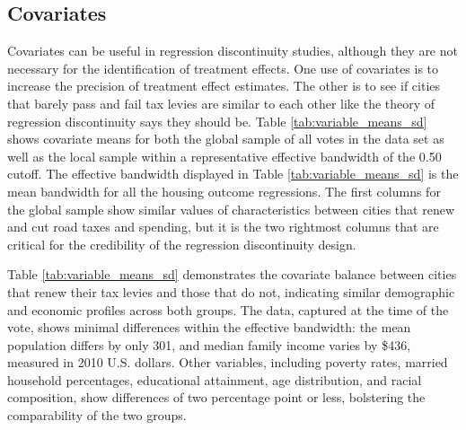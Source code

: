 \subsection{Covariates}

Covariates can be useful in regression discontinuity studies, although they are not necessary for the identification of treatment effects.  One use of covariates is to increase the precision of treatment effect estimates.  The other is to see if cities that barely pass and fail tax levies are similar to each other like the theory of regression discontinuity says they should be. Table \ref{tab:variable_means_sd} shows covariate means for both the global sample of all votes in the data set as well as the local sample within a representative effective bandwidth of the 0.50 cutoff. The effective bandwidth displayed in Table \ref{tab:variable_means_sd} is the mean bandwidth for all the housing outcome regressions. The first columns for the global sample show similar values of characteristics between cities that renew and cut road taxes and spending, but it is the two rightmost columns that are critical for the credibility of the regression discontinuity design.   

Table \ref{tab:variable_means_sd} demonstrates the covariate balance between cities that renew their tax levies and those that do not, indicating similar demographic and economic profiles across both groups. The data, captured at the time of the vote, shows minimal differences within the effective bandwidth: the mean population differs by only 301, and median family income varies by \$436, measured in 2010 U.S. dollars. Other variables, including poverty rates, married household percentages, educational attainment, age distribution, and racial composition, show differences of two percentage point or less, bolstering the comparability of the two groups.

